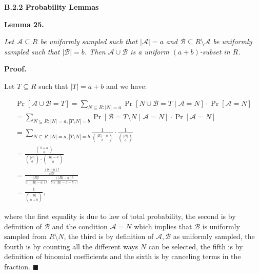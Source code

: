 \par\medskip\noindent\textbf{B.2.2 Probability Lemmas}\par





\par\medskip\noindent\textbf{\textbf{Lemma 25}\textbf{.}}\par



\emph{Let $\mathcal{A}\subseteq R$ be uniformly sampled such that $|\mathcal{A}|=a$ and $\mathcal{B}\subseteq R\setminus\mathcal{A}$ be uniformly sampled such that $|\mathcal{B}|=b$.
Then $\mathcal{A}\cup\mathcal{B}$ is a uniform $(a+b)$-subset in $R$.}\par






\par\medskip\noindent\textbf{Proof.}\par



Let $T\subseteq R$ such that $|T|=a+b$ and we have:\par


\[\begin{gathered}
\displaystyle\Pr[\mathcal{A}\cup\mathcal{B}=T] \displaystyle=\sum_{N\subseteq R:|N|=a}\Pr[N\cup\mathcal{B}=T\mid\mathcal{A}=N]\cdot\Pr[\mathcal{A}=N] \\
\displaystyle=\sum_{N\subseteq R:|N|=a,|T\setminus N|=b}\Pr[\mathcal{B}=T\setminus N\mid\mathcal{A}=N]\cdot\Pr[\mathcal{A}=N] \\
\displaystyle=\sum_{N\subseteq R:|N|=a,|T\setminus N|=b}\frac{1}{\binom{|R|-a}{b}}\cdot\frac{1}{\binom{|R|}{a}} \\
\displaystyle=\frac{\binom{b+a}{a}}{\binom{|R|}{a}\cdot\binom{|R|-a}{b}} \\
\displaystyle=\frac{\frac{(b+a)!}{a!b!}}{\frac{|R|!}{a!(|R|-a)!}\cdot\frac{(|R|-a)!}{b!(|R|-a-b)!}} \\
\displaystyle=\frac{1}{\binom{|R|}{a+b}},
\end{gathered}\]


where the first equality is due to law of total probability, the second is by definition of $\mathcal{B}$ and the condition $\mathcal{A}=N$ which implies that $\mathcal{B}$ is uniformly sampled from $R\setminus N$, the third is by definition of $\mathcal{A},\mathcal{B}$ as uniformly sampled, the fourth is by counting all the different ways $N$ can be selected, the fifth is by definition of binomial coefficients and the sixth is by canceling terms in the fraction.
\ensuremath{\blacksquare}\par




